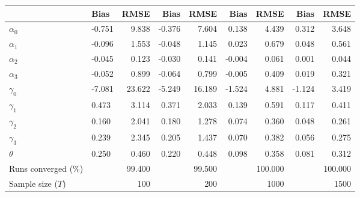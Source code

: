 
\begin{tabular}[t]{llrrrrrrr}
\toprule
  & Bias & RMSE & Bias & RMSE & Bias & RMSE & Bias & RMSE\\
\midrule
$\alpha_{0}$ & -0.751 & 9.838 & -0.376 & 7.604 & 0.138 & 4.439 & 0.312 & 3.648\\
$\alpha_{1}$ & -0.096 & 1.553 & -0.048 & 1.145 & 0.023 & 0.679 & 0.048 & 0.561\\
$\alpha_{2}$ & -0.045 & 0.123 & -0.030 & 0.141 & -0.004 & 0.061 & 0.001 & 0.044\\
$\alpha_{3}$ & -0.052 & 0.899 & -0.064 & 0.799 & -0.005 & 0.409 & 0.019 & 0.321\\
$\gamma_{0}$ & -7.081 & 23.622 & -5.249 & 16.189 & -1.524 & 4.881 & -1.124 & 3.419\\
$\gamma_{1}$ & 0.473 & 3.114 & 0.371 & 2.033 & 0.139 & 0.591 & 0.117 & 0.411\\
$\gamma_{2}$ & 0.160 & 2.041 & 0.180 & 1.278 & 0.074 & 0.360 & 0.048 & 0.261\\
$\gamma_{3}$ & 0.239 & 2.345 & 0.205 & 1.437 & 0.070 & 0.382 & 0.056 & 0.275\\
$\theta$ & 0.250 & 0.460 & 0.220 & 0.448 & 0.098 & 0.358 & 0.081 & 0.312\\
Runs converged (\%) &  & 99.400 &  & 99.500 &  & 100.000 &  & 100.000\\
Sample size ($T$) &  & 100 &  & 200 &  & 1000 &  & 1500\\
\bottomrule
\end{tabular}
